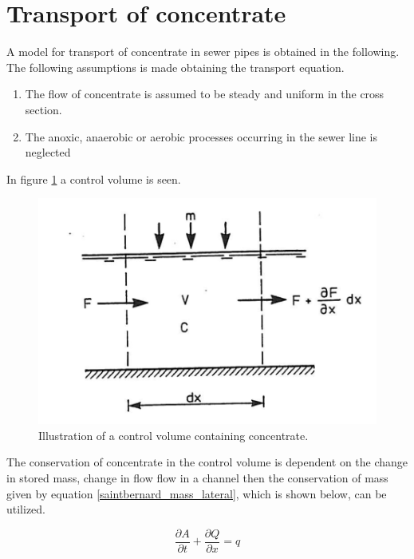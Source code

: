 \section{Transport of concentrate}\label{se:transport_of_concentrate}

A model for transport of concentrate in sewer pipes is obtained in the following.
The following assumptions is made obtaining the transport equation.

 \begin{table}[H]
\begin{enumerate}
	\item The flow of concentrate is assumed to be steady and uniform in the cross section.
	\item The anoxic, anaerobic or aerobic processes occurring in the sewer line is neglected   
\end{enumerate}
\label{tab:concentrate_flow}
\end{table}
 
In figure \ref{fig:poopvolume} a control volume is seen.
\begin{figure}[H]
\centering
\includegraphics[width=.6\textwidth]{report/modeling/pictures/poopvolume.png}
\caption{Illustration of a control volume containing concentrate.}
\label{fig:poopvolume}
\end{figure} 

The conservation of concentrate in the control volume is dependent on the change in stored mass, change in flow  
 flow in a channel then the conservation of mass given by equation \ref{saintbernard_mass_lateral}, which is shown below, can be utilized.

\begin{equation}	
\frac{\partial A}{\partial t} + \frac{\partial Q}{\partial x}=q
\end{equation}

